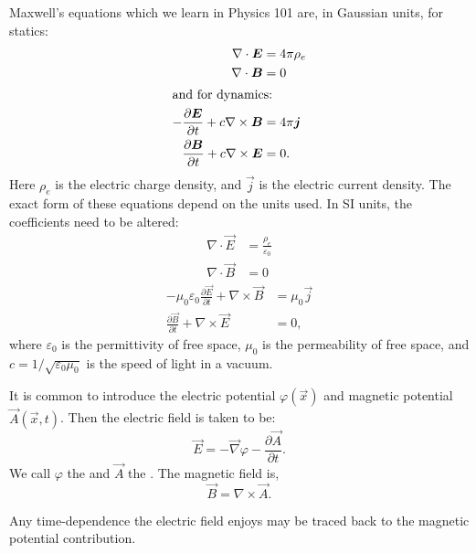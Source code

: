 Maxwell's equations which we learn in Physics 101 are, in Gaussian
units, for statics:
\begin{subequations}
\begin{align}
\nabla\cdot\vec{E} &= 4\pi\rho_{e}\\
\nabla\cdot\vec{B} &= 0\\
\intertext{and for dynamics:}
-\frac{\partial\vec{E}}{\partial t} + c\nabla\times\vec{B} &= 4\pi\vec{j}\\
\frac{\partial\vec{B}}{\partial t} + c\nabla\times\vec{E} &= 0.
\end{align}
\end{subequations}
Here $\rho_{e}$ is the electric charge density, and $\vec{j}$ is
the electric current density.
The exact form of these equations depend on the units used. In SI units,
the coefficients need to be altered:
\begin{subequations}
\begin{align}
\nabla\cdot\vec{E} &= \frac{\rho_{e}}{\varepsilon_{0}}\\
\nabla\cdot\vec{B} &= 0
\end{align}
\end{subequations}
\begin{subequations}
\begin{align}
-\mu_{0}\varepsilon_{0}\frac{\partial\vec{E}}{\partial t} + \nabla\times\vec{B} &= \mu_{0}\vec{j}\\
\frac{\partial\vec{B}}{\partial t} + \nabla\times\vec{E} &= 0,
\end{align}
\end{subequations}
where $\varepsilon_{0}$ is the permittivity of free space, $\mu_{0}$ is
the permeability of free space, and $c=1/\sqrt{\varepsilon_{0}\mu_{0}}$
is the speed of light in a vacuum.

It is common to introduce the electric potential $\varphi(\vec{x})$
and magnetic potential $\vec{A}(\vec{x}, t)$. Then the electric field is
taken to be:
\begin{equation}
\vec{E} = -\vec{\nabla}\varphi - \frac{\partial\vec{A}}{\partial t}.
\end{equation}
We call $\varphi$ the  and $\vec{A}$ the
.
The magnetic field is,
\begin{equation}
\vec{B} = \nabla\times\vec{A}.
\end{equation}

\begin{remark}
Any time-dependence the electric field enjoys may be traced back to the
magnetic potential contribution.
\end{remark}


